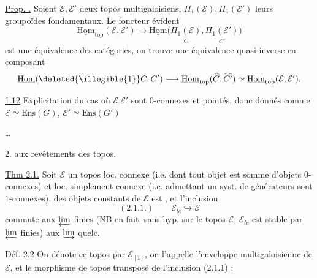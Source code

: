 
\uline{Prop. .} Soient $\mathcal E,\mathcal E'$ deux topos multigaloisiens, $\Pi_1(\mathcal E),\Pi_1(\mathcal E')$ leurs groupoïdes fondamentaux. Le foncteur évident
\[
\underline{\mathrm{Hom}}_{\mathrm{top}}(\mathcal E,\mathcal E')
\longrightarrow
\underline{\mathrm{Hom}}\bigl(
\underset{C}{\underline{\Pi_1(\mathcal E)}},
\underset{C'}{\underline{\Pi_1(\mathcal E')}}\bigr)
\]
est une équivalence des catégories, on trouve une équivalence quasi-inverse en composant
\[
\underline{\mathrm{Hom}}(\deleted{\illegible{1}}C,C')
\longrightarrow
\underline{\mathrm{Hom}}_{\mathrm{top}}(\widehat C,\widehat {C'})
\simeq
\underline{\mathrm{Hom}}_{\mathrm{top}}(\mathcal E,\mathcal E').
\]

\uline{1.12} Explicitation du cas où $\mathcal E\ \mathcal E'$ sont $0$-connexes et pointés, donc donnés comme $\mathcal E\simeq\mathrm{Ens}(G)$, $\mathcal E'\simeq\mathrm{Ens}(G')$

\dots



2.  aux revêtements des topos.

\uline{Thm 2.1.} Soit $\mathcal E$ un topos loc. connexe (i.e. dont tout objet est somme d'objets $0$-connexes) et loc. simplement connexe (i.e. admettant un syst. de générateurs  sont $1$-connexes).
 des objets  constants de $\mathcal E$ est  , et l'inclusion
\[
(2.1.1.)\qquad \mathcal E_{lc}\hookrightarrow\mathcal E
\]
commute aux $\varprojlim$ finies (NB en fait, sans hyp. sur le topos $\mathcal E$, $\mathcal E_{lc}$ est stable par $\varprojlim$ finies)  aux $\varinjlim$ quelc.

\uline{Déf. 2.2} On dénote ce topos par $\mathcal E_{[1]}$, on l'appelle l'enveloppe multigaloisienne de $\mathcal E$, et le morphisme de topos transposé de l'inclusion (2.1.1) :



